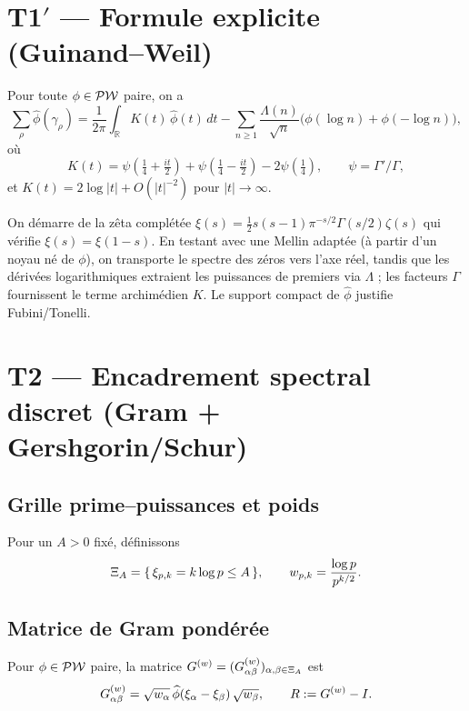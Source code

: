 \documentclass[11pt,a4paper]{proofarticle}
\begin{document}
\section{\texorpdfstring{T1$′$ — Formule explicite (Guinand–Weil)}{T1′ — Formule explicite (Guinand–Weil)}}
\begin{theorem}\label{thm:T1prime}
Pour toute $\phi\in\mathcal{PW}$ paire, on a
\begin{equation}\label{eq:explicit}
\sum_{\rho}\widehat\phi(\gamma_\rho)
=\frac{1}{2\pi}\int_{\mathbb R}K(t)\,\widehat\phi(t)\,dt
-\sum_{n\ge 1}\frac{\Lambda(n)}{\sqrt{n}}\big(\phi(\log n)+\phi(-\log n)\big),
\end{equation}
où
\[
K(t)=\psi\!\left(\tfrac14+\tfrac{it}{2}\right)+\psi\!\left(\tfrac14-\tfrac{it}{2}\right)-2\psi\!\left(\tfrac14\right),
\qquad \psi=\Gamma'/\Gamma,
\]
et $K(t)=2\log|t|+O(|t|^{-2})$ pour $|t|\to\infty$.
\end{theorem}

\begin{remark}
On démarre de la zêta complétée $\xi(s)=\tfrac12 s(s-1)\pi^{-s/2}\Gamma(s/2)\zeta(s)$ qui vérifie
$\xi(s)=\xi(1-s)$. En testant avec une Mellin adaptée (à partir d’un noyau né de $\phi$), on transporte
le spectre des zéros vers l’axe réel, tandis que les dérivées logarithmiques extraient les puissances de premiers
via $\Lambda$ ; les facteurs $\Gamma$ fournissent le terme archimédien $K$. Le support compact de $\widehat\phi$
justifie Fubini/Tonelli.
\end{remark}

\section{T2 — Encadrement spectral discret (Gram + Gershgorin/Schur)}
\subsection{Grille prime--puissances et poids}
Pour un $A>0$ fixé, définissons
\[
\Xi_A=\{\,\xi_{p,k}=k\log p\le A\,\},\qquad
w_{p,k}=\frac{\log p}{p^{k/2}}.
\]

\subsection{Matrice de Gram pondérée}
Pour $\phi\in\mathcal{PW}$ paire, la matrice $G^{(w)}=(G^{(w)}_{\alpha\beta})_{\alpha,\beta\in\Xi_A}$ est
\[
G^{(w)}_{\alpha\beta}=\sqrt{w_\alpha}\,\widehat\phi(\xi_\alpha-\xi_\beta)\,\sqrt{w_\beta},\qquad
R:=G^{(w)}-I.
\]
\end{document}
